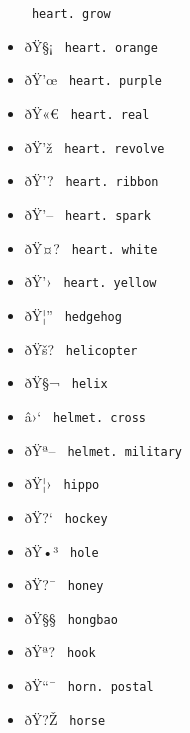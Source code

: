 \begin{itemize}
{  \texttt{\ heart.\ grow\ }}
\item
  \label{symbol-heart.orange}{{ ðŸ§¡ }
  \texttt{\ heart.\ orange\ }}
\item
  \label{symbol-heart.purple}{{ ðŸ'œ }
  \texttt{\ heart.\ purple\ }}
\item
  \label{symbol-heart.real}{{ ðŸ«€ }
  \texttt{\ heart.\ real\ }}
\item
  \label{symbol-heart.revolve}{{ ðŸ'ž }
  \texttt{\ heart.\ revolve\ }}
\item
  \label{symbol-heart.ribbon}{{ ðŸ'? }
  \texttt{\ heart.\ ribbon\ }}
\item
  \label{symbol-heart.spark}{{ ðŸ'-- }
  \texttt{\ heart.\ spark\ }}
\item
  \label{symbol-heart.white}{{ ðŸ¤? }
  \texttt{\ heart.\ white\ }}
\item
  \label{symbol-heart.yellow}{{ ðŸ'› }
  \texttt{\ heart.\ yellow\ }}
\item
  \label{symbol-hedgehog}{{ ðŸ¦'' }
  \texttt{\ hedgehog\ }}
\item
  \label{symbol-helicopter}{{ ðŸš? }
  \texttt{\ helicopter\ }}
\item
  \label{symbol-helix}{{ ðŸ§¬ } \texttt{\ helix\ }}
\item
  \label{symbol-helmet.cross}{{ â›` }
  \texttt{\ helmet.\ cross\ }}
\item
  \label{symbol-helmet.military}{{ ðŸª-- }
  \texttt{\ helmet.\ military\ }}
\item
  \label{symbol-hippo}{{ ðŸ¦› } \texttt{\ hippo\ }}
\item
  \label{symbol-hockey}{{ ðŸ?{}` } \texttt{\ hockey\ }}
\item
  \label{symbol-hole}{{ ðŸ•³ } \texttt{\ hole\ }}
\item
  \label{symbol-honey}{{ ðŸ?¯ } \texttt{\ honey\ }}
\item
  \label{symbol-hongbao}{{ ðŸ§§ } \texttt{\ hongbao\ }}
\item
  \label{symbol-hook}{{ ðŸª? } \texttt{\ hook\ }}
\item
  \label{symbol-horn.postal}{{ ðŸ``¯ }
  \texttt{\ horn.\ postal\ }}
\item
  \label{symbol-horse}{{ ðŸ?Ž } \texttt{\ horse\ }}

\end{itemize}
